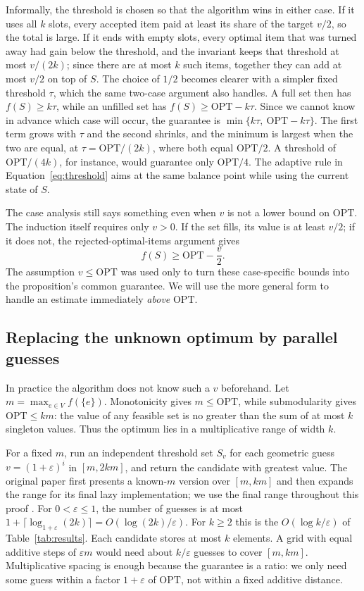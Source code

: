 \documentclass[10pt]{article}
\newcommand{\OPT}{\mathrm{OPT}}
\begin{document}
Informally, the threshold is chosen so that the algorithm wins in either case. If it uses all $k$ slots, every accepted item paid at least its share of the target $v/2$, so the total is large. If it ends with empty slots, every optimal item that was turned away had gain below the threshold, and the invariant keeps that threshold at most $v/(2k)$; since there are at most $k$ such items, together they can add at most $v/2$ on top of $S$. The choice of $1/2$ becomes clearer with a simpler fixed threshold $\tau$, which the same two-case argument also handles. A full set then has $f(S)\geq k\tau$, while an unfilled set has $f(S)\geq\OPT-k\tau$. Since we cannot know in advance which case will occur, the guarantee is $\min\{k\tau,\ \OPT-k\tau\}$. The first term grows with $\tau$ and the second shrinks, and the minimum is largest when the two are equal, at $\tau=\OPT/(2k)$, where both equal $\OPT/2$. A threshold of $\OPT/(4k)$, for instance, would guarantee only $\OPT/4$. The adaptive rule in Equation~\eqref{eq:threshold} aims at the same balance point while using the current state of $S$.

The case analysis still says something even when $v$ is not a lower bound on $\OPT$. The induction itself requires only $v>0$. If the set fills, its value is at least $v/2$; if it does not, the rejected-optimal-items argument gives
\begin{equation}
  f(S)\geq\OPT-\frac{v}{2}.
  \label{eq:two-cases}
\end{equation}
The assumption $v\leq\OPT$ was used only to turn these case-specific bounds into the proposition's common guarantee. We will use the more general form to handle an estimate immediately \emph{above} $\OPT$.

\subsection{Replacing the unknown optimum by parallel guesses}
In practice the algorithm does not know such a $v$ beforehand. Let $m=\max_{e\in V} f(\{e\})$. Monotonicity gives $m\leq\OPT$, while submodularity gives $\OPT\leq km$: the value of any feasible set is no greater than the sum of at most $k$ singleton values. Thus the optimum lies in a multiplicative range of width $k$.

For a fixed $m$, run an independent threshold set $S_v$ for each geometric guess $v=(1+\varepsilon)^i$ in $[m,2km]$, and return the candidate with greatest value. The original paper first presents a known-$m$ version over $[m,km]$ and then expands the range for its final lazy implementation; we use the final range throughout this proof \cite{badanidiyuru2014streaming}. For $0<\varepsilon\leq1$, the number of guesses is at most $1+\lceil\log_{1+\varepsilon}(2k)\rceil=O(\log(2k)/\varepsilon)$. For $k\geq2$ this is the $O(\log k/\varepsilon)$ of Table~\ref{tab:results}. Each candidate stores at most $k$ elements. A grid with equal additive steps of $\varepsilon m$ would need about $k/\varepsilon$ guesses to cover $[m,km]$. Multiplicative spacing is enough because the guarantee is a ratio: we only need some guess within a factor $1+\varepsilon$ of $\OPT$, not within a fixed additive distance.
\end{document}
